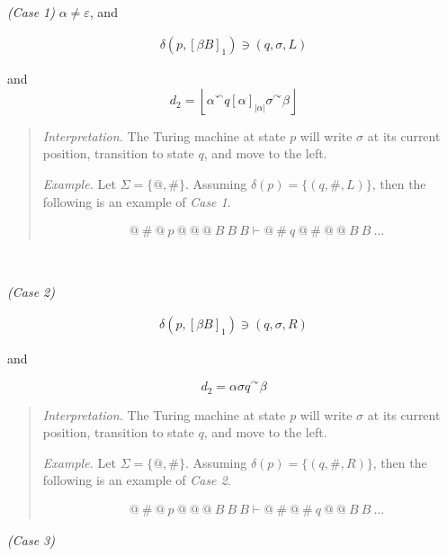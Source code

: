 \documentclass[a4paper, 12pt]{article}
\begin{document}
~

\textit{(Case 1)} $\alpha \neq \varepsilon$, and

\begin{align*}
    \delta \left( p, \left[ \beta B \right]_1  \right) \ni (q, \sigma, L)
\end{align*}

and 
$$d_2 = \left\lfloor \alpha {}^{\curvearrowleft} q [\alpha]_{|\alpha|} \sigma
{}^{\curvearrowright} \beta  \right\rfloor$$

\small 
\begin{quote}
    \textit{Interpretation.} The Turing machine at state $p$ will write $\sigma$
    at its current position, transition to state $q$, and move to the left. 

    \textit{Example.} Let $\Sigma = \{ @, \#\}$. Assuming $\delta (p) = \{ (q,
    \#, L) \}$, then the following is an example of
    \textit{Case 1}.
    
    \begin{align*}
        &@ ~ \# ~ @ ~ p ~ @ ~ @ ~ @ ~ B ~ B ~ B \vdash  @ ~ \# ~q ~ @ ~ \# ~ @ ~ @ ~ B ~ B
        ~ \ldots
    \end{align*}
\end{quote}
\normalsize 

~ 

\textit{(Case 2)} 

\begin{align*}
    \delta \left( p, \left[ \beta B \right]_1  \right) \ni (q, \sigma, R)
\end{align*}

and 

$$d_2 = \alpha \sigma q {}^{\curvearrowright} \beta $$

\small 
\begin{quote}
    \textit{Interpretation.} The Turing machine at state $p$ will write $\sigma$
    at its current position, transition to state $q$, and move to the left. 

    \textit{Example.} Let $\Sigma = \{ @, \#\}$. Assuming $\delta (p) = \{ (q,
    \#, R) \}$, then the following is an example of
    \textit{Case 2}.
    
    \begin{align*}
        &@ ~ \# ~ @ ~ p ~ @ ~ @ ~ @ ~ B ~ B ~ B \vdash  @ ~ \# ~@ ~ \# ~ q ~ @ ~
        @~ B ~ B
        ~ \ldots
    \end{align*}
\end{quote}
\normalsize 


\textit{(Case 3)} 
\end{document}
